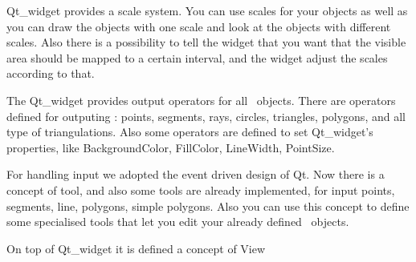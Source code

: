 Qt\_widget provides a scale system. You can use scales for your objects as 
well as you can draw the objects with one scale and look at the objects with 
different scales. Also there is a possibility to tell the widget that you
want that the visible area should be mapped to a certain interval, and the 
widget adjust the scales according to that.

The Qt\_widget provides output operators for all \cgal\ objects. There are 
operators defined for outputing : points, segments, rays, circles, triangles, 
polygons, and all type of triangulations. Also some operators are defined to 
set Qt\_widget's properties, like BackgroundColor, FillColor, LineWidth, 
PointSize.

For handling input we adopted the event driven design of Qt. Now there is a 
concept of tool, and also some tools are already implemented, for input points,
 segments, line, polygons, simple polygons. Also you can use this concept to 
define some specialised tools that let you edit your already defined \cgal\ objects.

On top of Qt\_widget it is defined a concept of View 

